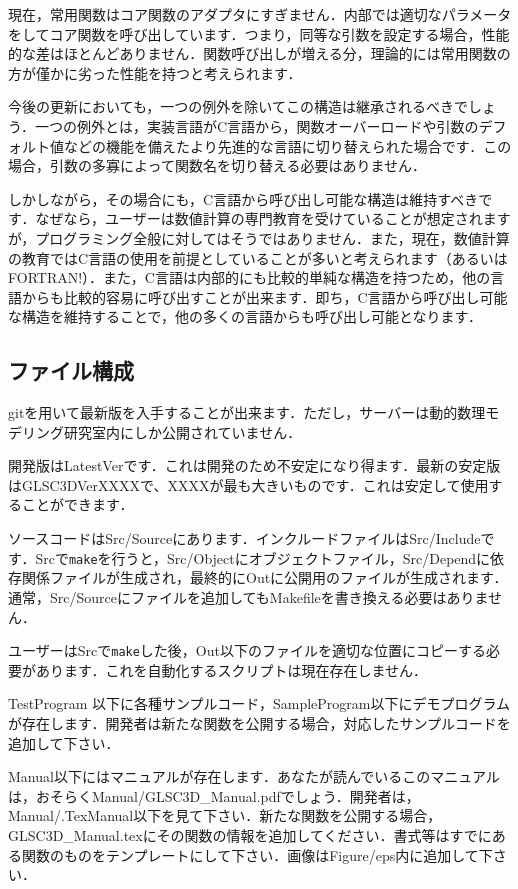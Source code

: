 \documentclass[platex,a4paper,12pt]{jsarticle}%
\begin{document}
現在，常用関数はコア関数のアダプタにすぎません．内部では適切なパラメータをしてコア関数を呼び出しています．つまり，同等な引数を設定する場合，性能的な差はほとんどありません．関数呼び出しが増える分，理論的には常用関数の方が僅かに劣った性能を持つと考えられます．

今後の更新においても，一つの例外を除いてこの構造は継承されるべきでしょう．一つの例外とは，実装言語がC言語から，関数オーバーロードや引数のデフォルト値などの機能を備えたより先進的な言語に切り替えられた場合です．この場合，引数の多寡によって関数名を切り替える必要はありません．

しかしながら，その場合にも，C言語から呼び出し可能な構造は維持すべきです．なぜなら，ユーザーは数値計算の専門教育を受けていることが想定されますが，プログラミング全般に対してはそうではありません．また，現在，数値計算の教育ではC言語の使用を前提としていることが多いと考えられます（あるいはFORTRAN!）．また，C言語は内部的にも比較的単純な構造を持つため，他の言語からも比較的容易に呼び出すことが出来ます．即ち，C言語から呼び出し可能な構造を維持することで，他の多くの言語からも呼び出し可能となります．


\subsection{ファイル構成}
gitを用いて最新版を入手することが出来ます．ただし，サーバーは動的数理モデリング研究室内にしか公開されていません．

開発版はLatestVerです．これは開発のため不安定になり得ます．最新の安定版はGLSC3DVerXXXXで、XXXXが最も大きいものです．これは安定して使用することができます．

ソースコードはSrc/Sourceにあります．インクルードファイルはSrc/Includeです．Srcで\verb|make|を行うと，Src/Objectにオブジェクトファイル，Src/Dependに依存関係ファイルが生成され，最終的にOutに公開用のファイルが生成されます．通常，Src/Sourceにファイルを追加してもMakefileを書き換える必要はありません．

ユーザーはSrcで\verb|make|した後，Out以下のファイルを適切な位置にコピーする必要があります．これを自動化するスクリプトは現在存在しません．

TestProgram 以下に各種サンプルコード，SampleProgram以下にデモプログラムが存在します．開発者は新たな関数を公開する場合，対応したサンプルコードを追加して下さい．

Manual以下にはマニュアルが存在します．あなたが読んでいるこのマニュアルは，おそらくManual/GLSC3D\_Manual.pdfでしょう．開発者は，Manual/.TexManual以下を見て下さい．新たな関数を公開する場合，GLSC3D\_Manual.texにその関数の情報を追加してください．書式等はすでにある関数のものをテンプレートにして下さい．画像はFigure/eps内に追加して下さい．
\end{document}
